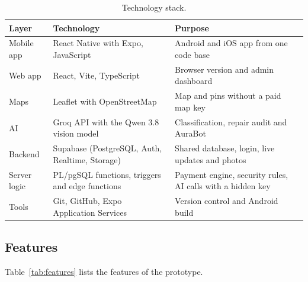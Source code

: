 \documentclass[conference,a4paper]{IEEEtran}
\begin{document}
\begin{table}[!t]\centering\footnotesize
\caption{Technology stack.}\label{tab:tech}
\begin{tabular}{L{2.6cm}L{6.2cm}L{8cm}}\toprule
\textbf{Layer} & \textbf{Technology} & \textbf{Purpose}\\\midrule
Mobile app & React Native with Expo, JavaScript \cite{rn,expo} & Android and iOS app from one code base\\
Web app & React, Vite, TypeScript & Browser version and admin dashboard\\
Maps & Leaflet with OpenStreetMap \cite{leaflet,osm} & Map and pins without a paid map key\\
AI & Groq API with the Qwen 3.8 vision model \cite{groq} & Classification, repair audit and AuraBot\\
Backend & Supabase (PostgreSQL, Auth, Realtime, Storage) \cite{supabase} & Shared database, login, live updates and photos\\
Server logic & PL/pgSQL functions, triggers and edge functions & Payment engine, security rules, AI calls with a hidden key\\
Tools & Git, GitHub, Expo Application Services & Version control and Android build\\\bottomrule
\end{tabular}\end{table}


\subsection{Features}
Table~\ref{tab:features} lists the features of the prototype.
\end{document}
